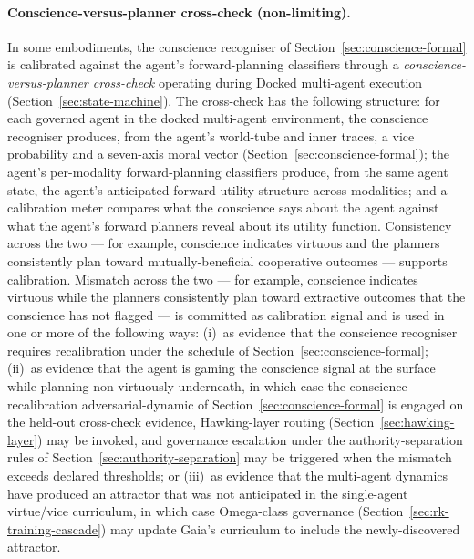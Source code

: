 \documentclass[a4paper,12pt]{article}
\begin{document}
\paragraph{Conscience-versus-planner cross-check (non-limiting).}
In some embodiments, the conscience recogniser of
Section~\ref{sec:conscience-formal} is calibrated against the
agent's forward-planning classifiers through a
\emph{conscience-versus-planner cross-check} operating during Docked
multi-agent execution (Section~\ref{sec:state-machine}). The
cross-check has the following structure: for each governed agent in
the docked multi-agent environment, the conscience recogniser
produces, from the agent's world-tube and inner traces, a vice
probability and a seven-axis moral vector
(Section~\ref{sec:conscience-formal}); the agent's per-modality
forward-planning classifiers produce, from the same agent state, the
agent's anticipated forward utility structure across modalities; and
a calibration meter compares what the conscience says about the
agent against what the agent's forward planners reveal about its
utility function. Consistency across the two --- for example,
conscience indicates virtuous and the planners consistently plan
toward mutually-beneficial cooperative outcomes --- supports
calibration. Mismatch across the two --- for example, conscience
indicates virtuous while the planners consistently plan toward
extractive outcomes that the conscience has not flagged --- is
committed as calibration signal and is used in one or more of the
following ways: (i)~as evidence that the conscience recogniser
requires recalibration under the schedule of
Section~\ref{sec:conscience-formal}; (ii)~as evidence that the
agent is gaming the conscience signal at the surface while planning
non-virtuously underneath, in which case the conscience-recalibration
adversarial-dynamic of Section~\ref{sec:conscience-formal} is
engaged on the held-out cross-check evidence, Hawking-layer routing
(Section~\ref{sec:hawking-layer}) may be invoked, and governance
escalation under the authority-separation rules of
Section~\ref{sec:authority-separation} may be triggered when the
mismatch exceeds declared thresholds; or (iii)~as evidence that the
multi-agent dynamics have produced an attractor that was not
anticipated in the single-agent virtue/vice curriculum, in which case
Omega-class governance
(Section~\ref{sec:rk-training-cascade}) may update Gaia's curriculum
to include the newly-discovered attractor.
\end{document}
